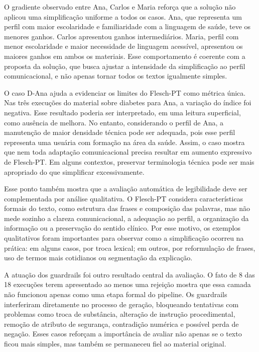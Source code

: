O gradiente observado entre Ana, Carlos e Maria reforça que a solução não aplicou uma simplificação uniforme a todos os casos. Ana, que representa um perfil com maior escolaridade e familiaridade com a linguagem de saúde, teve os menores ganhos. Carlos apresentou ganhos intermediários. Maria, perfil com menor escolaridade e maior necessidade de linguagem acessível, apresentou os maiores ganhos em ambos os materiais. Esse comportamento é coerente com a proposta da solução, que busca ajustar a intensidade da simplificação ao perfil comunicacional, e não apenas tornar todos os textos igualmente simples.

O caso D-Ana ajuda a evidenciar os limites do Flesch-PT como métrica única. Nas três execuções do material sobre diabetes para Ana, a variação do índice foi negativa. Esse resultado poderia ser interpretado, em uma leitura superficial, como ausência de melhora. No entanto, considerando o perfil de Ana, a manutenção de maior densidade técnica pode ser adequada, pois esse perfil representa uma usuária com formação na área da saúde. Assim, o caso mostra que nem toda adaptação comunicacional precisa resultar em aumento expressivo de Flesch-PT. Em alguns contextos, preservar terminologia técnica pode ser mais apropriado do que simplificar excessivamente.

Esse ponto também mostra que a avaliação automática de legibilidade deve ser complementada por análise qualitativa. O Flesch-PT considera características formais do texto, como estrutura das frases e composição das palavras, mas não mede sozinho a clareza comunicacional, a adequação ao perfil, a organização da informação ou a preservação do sentido clínico. Por esse motivo, os exemplos qualitativos foram importantes para observar como a simplificação ocorreu na prática: em alguns casos, por troca lexical; em outros, por reformulação de frases, uso de termos mais cotidianos ou segmentação da explicação.

A atuação dos guardrails foi outro resultado central da avaliação. O fato de 8 das 18 execuções terem apresentado ao menos uma rejeição mostra que essa camada não funcionou apenas como uma etapa formal do pipeline. Os guardrails interferiram diretamente no processo de geração, bloqueando tentativas com problemas como troca de substância, alteração de instrução procedimental, remoção de atributo de segurança, contradição numérica e possível perda de negação. Esses casos reforçam a importância de avaliar não apenas se o texto ficou mais simples, mas também se permaneceu fiel ao material original.

